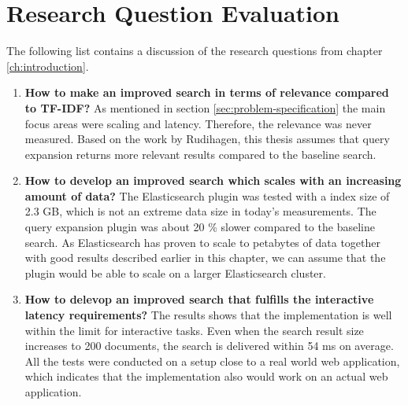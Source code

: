 \section{Research Question Evaluation}
\label{sec:reasearch-questions-evaluation}
The following list contains a discussion of the research questions from chapter \ref{ch:introduction}.

\begin{enumerate}
  \item \textbf{How to make an improved search in terms of relevance compared to TF-IDF?}
  As mentioned in section \ref{sec:problem-specification} the main focus areas were scaling and latency.
  Therefore, the relevance was never measured.
  Based on the work by Rudihagen,
  this thesis assumes that query expansion returns more relevant results compared to the baseline search.

  \item \textbf{How to develop an improved search which scales with an increasing amount of data?}
  The Elasticsearch plugin was tested with a index size of 2.3 GB,
  which is not an extreme data size in today's measurements.
  The query expansion plugin was about 20 \% slower compared to the baseline search.
  As Elasticsearch has proven to scale to petabytes of data \cite{elasticsearch-scale} together with good results described earlier in this chapter,
  we can assume that the plugin would be able to scale on a larger Elasticsearch cluster.


  \item \textbf{How to delevop an improved search that fulfills the interactive latency requirements?}
  The results shows that the implementation is well within the limit for interactive tasks.
  Even when the search result size increases to 200 documents,
  the search is delivered within 54 ms on average.
  All the tests were conducted on a setup close to a real world web application,
  which indicates that the implementation also would work on an actual web application.

\end{enumerate}
